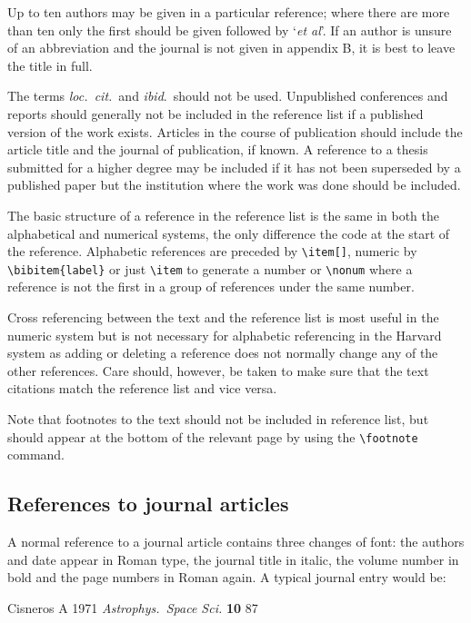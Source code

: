 \documentclass[12pt]{iopart}
\begin{document}
Up to ten authors may be given in a particular reference; where 
there are more than ten only the first should be given followed by 
`{\it et al}'. If an author is unsure of an abbreviation and the 
journal is not given in appendix B, it is best to leave the title in full. 

The terms {\it loc.\ cit.}\ and {\it ibid}.\ should not be used. 
Unpublished conferences and reports should generally not be included 
in the reference list if a published version of the work exists. Articles in the course of publication should 
include the article title and the journal of publication, if known. 
A reference to a thesis submitted for a higher degree may be included 
if it has not been superseded by a published 
paper but the institution where the work was done should be included.

The basic structure of a reference in the reference list is the same in both the alphabetical and numerical systems, the only difference the code at the start of the reference. Alphabetic references are preceded by \verb"\item[]", numeric by \verb"\bibitem{label}" or just \verb"\item" to generate a number or \verb"\nonum" where a reference is not the first in a group of references under the same number.

Cross referencing between the text and the 
reference list is most useful in the numeric system but is not necessary for alphabetic referencing 
in the Harvard system as adding or deleting a reference 
does not normally change any of the other references. 
Care should, however, be taken to make sure that the text citations match the reference list and vice versa.

Note that footnotes to the text should not be 
included in reference list, but should appear at the bottom of the relevant page by using the \verb"\footnote" command.
   
\subsection{References to journal articles}
A normal reference to a journal article contains three changes of 
font:
the authors and date appear in Roman type, the journal title in 
italic, the volume number in bold and the page numbers in Roman again. 
A typical journal entry would be:

\smallskip
\begin{harvard}
\item[] Cisneros A 1971 {\it Astrophys.\ Space Sci.} {\bf 10} 87
\end{harvard}
\smallskip
\end{document}
